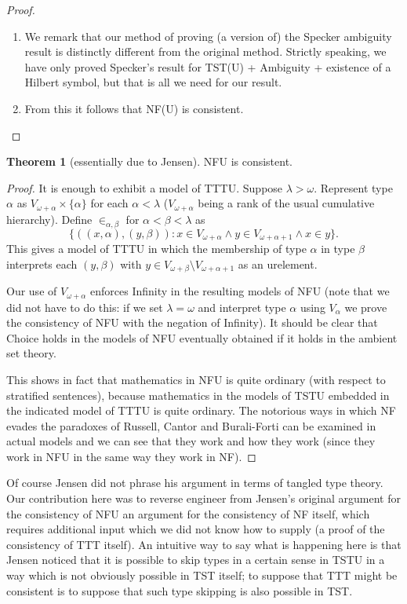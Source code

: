 \documentclass[112pt]{article}
\theoremstyle{definition}
\newtheorem{theorem}{Theorem}[section]
\theoremstyle{remark}
\begin{document}
\begin{proof}
\begin{enumerate}
\begin{enumerate}
\item  We remark that our method of proving (a version of) the Specker ambiguity result is distinctly different from the original method.  Strictly speaking, we have only proved Specker's result for TST(U) + Ambiguity + existence of a Hilbert symbol, but that is all we need for our result.

\item From this it follows that NF(U) is consistent.
\end{enumerate}

\end{enumerate}
\end{proof}

\begin{theorem}[essentially due to Jensen]
  NFU is consistent.
\end{theorem}
\begin{proof}
It is enough to exhibit a model of TTTU.  Suppose $\lambda>\omega$.  Represent type $\alpha$ as $V_{\omega+\alpha} \times \{\alpha\}$ for each $\alpha<\lambda$ ($V_{\omega+\alpha}$ being a rank of the usual cumulative hierarchy).  Define $\in_{\alpha,\beta}$ for
$\alpha<\beta<\lambda$ as $$\{((x,\alpha),(y,\beta)):x \in V_{\omega+\alpha} \wedge y \in V_{\omega+\alpha+1} \wedge x \in y\}.$$  This gives a model of TTTU in which the membership of
type $\alpha$ in type $\beta$ interprets each $(y,\beta)$ with $y \in V_{\omega+\beta} \setminus V_{\omega+\alpha+1}$ as an urelement.

Our use of $V_{\omega+\alpha}$ enforces Infinity in the resulting models of NFU (note that we did not have to do this:  if we set $\lambda=\omega$ and interpret type $\alpha$ using $V_\alpha$ we prove the consistency of NFU with the negation of Infinity).  It should be clear that Choice holds in the models of NFU eventually obtained if it holds in the ambient set theory.

This shows in fact that mathematics in NFU is quite ordinary (with respect to stratified sentences), because mathematics in the models of TSTU embedded in the indicated model of TTTU is quite ordinary.  The notorious ways in which NF evades the paradoxes of Russell, Cantor and Burali-Forti can be examined in actual models and we can see that they work and how they work (since they work in NFU in the same way they work in NF).
\end{proof}

Of course Jensen did not phrase his argument in terms of tangled type theory.  Our contribution here was to reverse engineer from Jensen's original argument for the consistency of NFU an argument for the consistency of NF itself, which requires additional input which we did not know how to supply (a proof of the consistency of TTT itself).  An intuitive way to say what is happening here is that Jensen noticed that it is possible to skip types in a certain sense in TSTU in a way which is not obviously possible in TST itself;  to suppose that TTT might be consistent is to suppose that such type skipping is also possible in TST.
\end{document}
